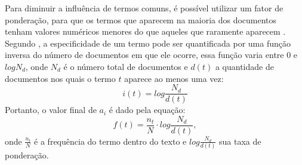 Para diminuir a influência de termos comuns, é possível utilizar um fator de ponderação, para que os termos que aparecem na maioria dos documentos tenham valores numéricos menores do que aqueles que raramente aparecem \cite{pretext}. Segundo , a especificidade de um termo pode ser quantificada por uma função inversa do número de documentos em que ele ocorre, essa função varia entre \(0\) e \(log N_d\), onde \(N_d\) é o número total de documentos e \(d(t)\) a quantidade de documentos nos quais o termo \(t\) aparece ao menos uma vez:
%
\begin{equation}
i(t)=log \frac{N_d}{d(t)}
\end{equation}
%
Portanto, o valor final de \(a_{i}\) é dado pela equação:
%
\begin{equation}
f(t)=\frac{n_t}{N} \cdot log \frac{N_d}{d(t)},
\end{equation}
%
onde \(\frac{n_t}{N}\) é a frequência do termo dentro do texto e \(log \frac{N_d}{d(t)}\) sua taxa de ponderação.
